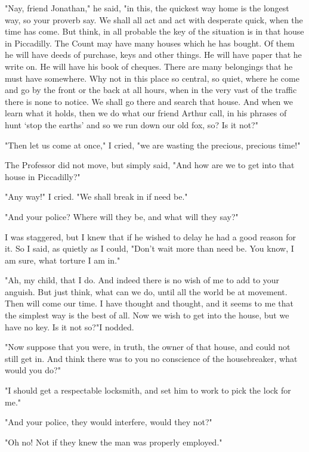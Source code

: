 "Nay, friend Jonathan," he said, "in this, the quickest way home is the longest way, so your proverb say. We shall all act and act with desperate quick, when the time has come. But think, in all probable the key of the situation is in that house in Piccadilly. The Count may have many houses which he has bought. Of them he will have deeds of purchase, keys and other things. He will have paper that he write on. He will have his book of cheques. There are many belongings that he must have somewhere. Why not in this place so central, so quiet, where he come and go by the front or the back at all hours, when in the very vast of the traffic there is none to notice. We shall go there and search that house. And when we learn what it holds, then we do what our friend Arthur call, in his phrases of hunt `stop the earths' and so we run down our old fox, so? Is it not?" 

"Then let us come at once," I cried, "we are wasting the precious, precious time!" 

The Professor did not move, but simply said, "And how are we to get into that house in Piccadilly?" 

"Any way!" I cried. "We shall break in if need be." 

"And your police? Where will they be, and what will they say?" 

I was staggered, but I knew that if he wished to delay he had a good reason for it. So I said, as quietly as I could, "Don't wait more than need be. You know, I am sure, what torture I am in." 

"Ah, my child, that I do. And indeed there is no wish of me to add to your anguish. But just think, what can we do, until all the world be at movement. Then will come our time. I have thought and thought, and it seems to me that the simplest way is the best of all. Now we wish to get into the house, but we have no key. Is it not so?"I nodded. 

"Now suppose that you were, in truth, the owner of that house, and could not still get in. And think there was to you no conscience of the housebreaker, what would you do?" 

"I should get a respectable locksmith, and set him to work to pick the lock for me." 

"And your police, they would interfere, would they not?" 

"Oh no! Not if they knew the man was properly employed." 

